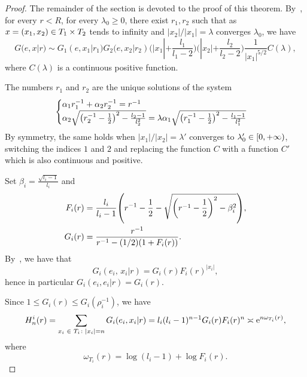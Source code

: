 \documentclass[AHL,Unicode,longabstracts]{cedram}
\newcommand{\rme}{\mathrm{e}}
\let\originalleft\left
\let\originalright\right
\renewcommand{\left}{\mathopen{}\mathclose\bgroup\originalleft}
\renewcommand{\right}{\aftergroup\egroup\originalright}
\let\oldin\in
\renewcommand{\in}{\mathchoice{\oldin}{\oldin}{\,\oldin\,}{\,\oldin\,}}
\begin{document}
\begin{proof}
The remainder of the section is devoted to the proof of this theorem. By~\cite[Theorem~3.1]{PicardelloWoessbitree}, for every $r<R$, for every $\lambda_0\geq 0$, there exist $r_1,r_2$ such that as $x=(x_1,x_2) \in T_1\times T_2$ tends to infinity and $|x_2|/|x_1|=\lambda$ converges $\lambda_0$, we have
\[
G(e,x|r)\sim G_1(e,x_1|r_1)G_2(e,x_2|r_2)\bigg(|x_1|+\frac{l_1}{l_1-2}\bigg)\bigg(|x_2|+\frac{l_2}{l_2-2}\bigg)\frac{1}{|x_1|^{5/2}}C(\lambda),
\]
where $C(\lambda)$ is a continuous positive function.

The numbers $r_1$ and $r_2$ are the unique solutions of the system
\begin{equation}\label{systemr1r2}
\begin{cases}
\alpha_1r_1^{-1}+\alpha_2r_2^{-1}=r^{-1}\\
\alpha_2\sqrt{\left(r_2^{-1}-\frac{1}{2}\right)^2-\frac{l_2-1}{l_2^2}}=\lambda \alpha_1\sqrt{\left(r_1^{-1}-\frac{1}{2}\right)^2-\frac{l_1-1}{l_1^2}}
\end{cases}
\end{equation}
By symmetry, the same holds when $|x_1|/|x_2|=\lambda'$ converges to $\lambda'_0\in [0,+\infty)$, switching the indices $1$ and $2$ and replacing the function $C$ with a function $C'$ which is also continuous and positive.

Set $\beta_i = \frac{\sqrt{l_i - 1}}{l_i}$ and
\begin{align*}
F_i(r) &= \frac{l_i}{l_i - 1} \left(r^{-1} - \frac{1}{2} - \sqrt{\left(r^{-1} - \frac{1}{2} \right)^2 - \beta_i^2} \right), \\
G_i(r) &= \frac{r^{-1}}{r^{-1} - (1/2) \left(1 + F_i(r) \right)}.
\end{align*}
By~\cite[(2.4)]{PicardelloWoessbitree}, we have that
\[
G_i(e_i, \, x_i | r) = G_i(r) F_i(r)^{|x_i|},
\]
hence in particular $G_i(e_i,e_i|r)=G_i(r)$.

Since $1 \leq G_i(r) \leq G_i(\rho_i^{-1})$, we have
\begin{equation}\label{Hniasymp}
H_n^i(r) = \sum_{x_i \in T_i \colon |x_i| =n} G_i(e_i, x_i | r) = l_i (l_i - 1)^{n - 1} G_i(r) F_i(r)^n \asymp \rme^{n \omega_{T_i}(r)},
\end{equation}
where
\[
\omega_{T_i}(r) = \log (l_i - 1) + \log F_i(r).
\]


\end{proof}
\end{document}
